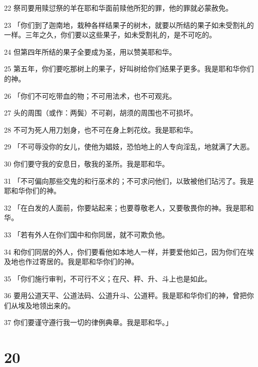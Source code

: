 \par 22 祭司要用赎愆祭的羊在耶和华面前赎他所犯的罪，他的罪就必蒙赦免。
\par 23 「你们到了迦南地，栽种各样结果子的树木，就要以所结的果子如未受割礼的一样。三年之久，你们要以这些果子，如未受割礼的，是不可吃的。
\par 24 但第四年所结的果子全要成为圣，用以赞美耶和华。
\par 25 第五年，你们要吃那树上的果子，好叫树给你们结果子更多。我是耶和华你们的神。
\par 26 「你们不可吃带血的物；不可用法术，也不可观兆。
\par 27 头的周围（或作：两鬓）不可剃，胡须的周围也不可损坏。
\par 28 不可为死人用刀划身，也不可在身上刺花纹。我是耶和华。
\par 29 「不可辱没你的女儿，使他为娼妓，恐怕地上的人专向淫乱，地就满了大恶。
\par 30 你们要守我的安息日，敬我的圣所。我是耶和华。
\par 31 「不可偏向那些交鬼的和行巫术的；不可求问他们，以致被他们玷污了。我是耶和华你们的神。
\par 32 「在白发的人面前，你要站起来；也要尊敬老人，又要敬畏你的神。我是耶和华。
\par 33 「若有外人在你们国中和你同居，就不可欺负他。
\par 34 和你们同居的外人，你们要看他如本地人一样，并要爱他如己，因为你们在埃及地也作过寄居的。我是耶和华你们的神。
\par 35 「你们施行审判，不可行不义；在尺、秤、升、斗上也是如此。
\par 36 要用公道天平、公道法码、公道升斗、公道秤。我是耶和华你们的神，曾把你们从埃及地领出来的。
\par 37 你们要谨守遵行我一切的律例典章。我是耶和华。」

\chapter{20}

